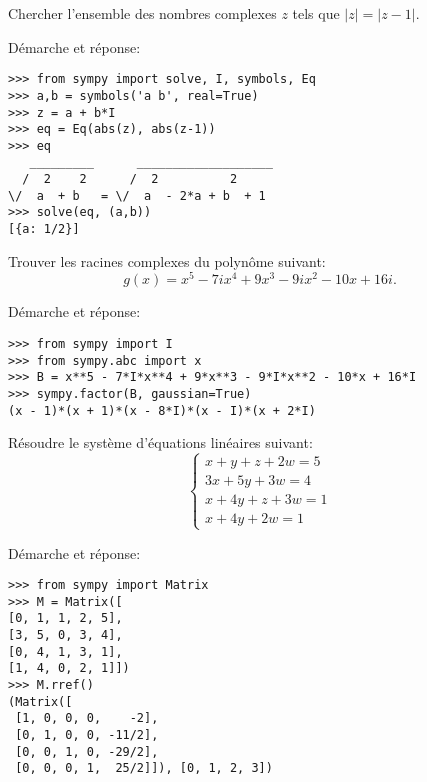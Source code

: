 \begin{question}[1 pts]
    Chercher l'ensemble des nombres complexes $z$ tels que $|z|=|z-1|$.
\begin{mybox}
Démarche et réponse:
\begin{reponse}
\begin{verbatim}
>>> from sympy import solve, I, symbols, Eq
>>> a,b = symbols('a b', real=True)
>>> z = a + b*I
>>> eq = Eq(abs(z), abs(z-1))
>>> eq
   _________      ___________________
  /  2    2      /  2          2
\/  a  + b   = \/  a  - 2*a + b  + 1
>>> solve(eq, (a,b))
[{a: 1/2}]
\end{verbatim}
\end{reponse}
\end{mybox}
\end{question}




\newpage
\begin{question}[1 pts]
Trouver les racines complexes du polynôme suivant:
\[
    g(x) = x^5 - 7i x^4 + 9x^3 - 9i x^2 - 10x + 16i.
\]
\begin{mybox}
Démarche et réponse:
\begin{reponse}
\begin{verbatim}
>>> from sympy import I
>>> from sympy.abc import x
>>> B = x**5 - 7*I*x**4 + 9*x**3 - 9*I*x**2 - 10*x + 16*I
>>> sympy.factor(B, gaussian=True)
(x - 1)*(x + 1)*(x - 8*I)*(x - I)*(x + 2*I)
\end{verbatim}
\end{reponse}
\end{mybox}
\end{question}


\begin{question}[2 pts]
Résoudre le système d'équations linéaires suivant:
\[
\left\{
\begin{array}{r}
 x +  y +  z + 2w =5\\
3x + 5y      + 3w =4\\
 x + 4y +  z + 3w =1\\
 x + 4y      + 2w =1
\end{array}
\right.
\]
\begin{mybox}
Démarche et réponse:
\begin{reponse}
\begin{verbatim}
>>> from sympy import Matrix
>>> M = Matrix([
[0, 1, 1, 2, 5],
[3, 5, 0, 3, 4],
[0, 4, 1, 3, 1],
[1, 4, 0, 2, 1]])
>>> M.rref()
(Matrix([
 [1, 0, 0, 0,    -2],
 [0, 1, 0, 0, -11/2],
 [0, 0, 1, 0, -29/2],
 [0, 0, 0, 1,  25/2]]), [0, 1, 2, 3])
\end{verbatim}
\end{reponse}
\end{mybox}
\end{question}




